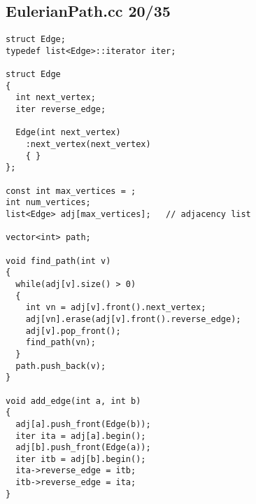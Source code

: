 \subsection{EulerianPath.cc 20/35}
\begin{lstlisting}
struct Edge;
typedef list<Edge>::iterator iter;

struct Edge
{
  int next_vertex;
  iter reverse_edge;

  Edge(int next_vertex)
    :next_vertex(next_vertex)
    { }
};

const int max_vertices = ;
int num_vertices;
list<Edge> adj[max_vertices];   // adjacency list

vector<int> path;

void find_path(int v)
{
  while(adj[v].size() > 0)
  {
    int vn = adj[v].front().next_vertex;
    adj[vn].erase(adj[v].front().reverse_edge);
    adj[v].pop_front();
    find_path(vn);
  }
  path.push_back(v);
}

void add_edge(int a, int b)
{
  adj[a].push_front(Edge(b));
  iter ita = adj[a].begin();
  adj[b].push_front(Edge(a));
  iter itb = adj[b].begin();
  ita->reverse_edge = itb;
  itb->reverse_edge = ita;
}

\end{lstlisting}
